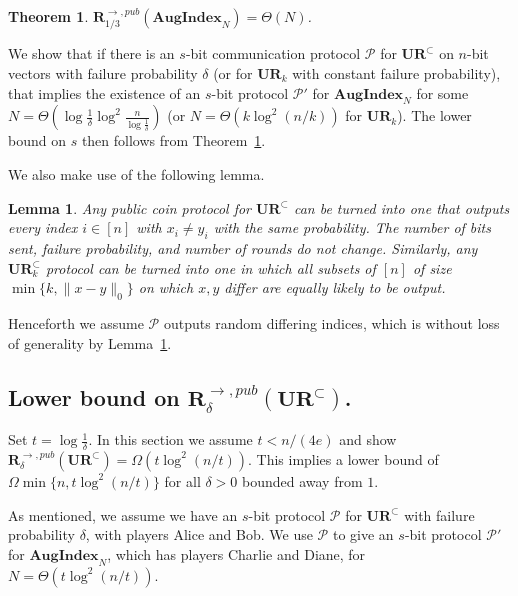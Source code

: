 \documentclass[11pt]{article}
\newtheorem{theorem}{Theorem}
\newtheorem{lemma}{Lemma}
\newcommand{\aug}{\mathbf{AugIndex}\xspace}
\newcommand{\ur}{\mathbf{UR}\xspace}
\newcommand{\randcom}{\mathbf{R}}
\begin{document}
\begin{theorem}{\cite{MiltersenNSW98}}\label{thm:mnsw}
$\randcom^{\rightarrow,pub}_{1/3}(\aug_N) = \Theta(N)$.
\end{theorem}

We show that if there is an $s$-bit communication protocol $\mathcal P$ for $\ur^\subset$ on $n$-bit vectors with failure probability $\delta$ (or for $\ur_k$ with constant failure probability), that implies the existence of an $s$-bit protocol $\mathcal P'$ for $\aug_N$ for some $N=\Theta(\log\frac 1{\delta}\log^2\frac n{\log\frac 1{\delta}})$ (or $N=\Theta(k\log^2(n/k))$ for $\ur_k$). The lower bound on $s$ then follows from Theorem~\ref{thm:mnsw}.

We also make use of the following lemma.

\begin{lemma}{\cite{JowhariST11}}\label{lem:rand-ur}
Any public coin protocol for $\ur^\subset$ can be turned into one that outputs every index $i\in[n]$ with $x_i\neq y_i$ with the same probability. The number of bits sent, failure probability, and number of rounds do not change. Similarly, any $\ur_k^\subset$ protocol can be turned into one in which all subsets of $[n]$ of size $\min\{k, \|x-y\|_0\}$ on which $x, y$ differ are equally likely to be output.
\end{lemma}

Henceforth we assume $\mathcal P$ outputs random differing indices, which is without loss of generality by Lemma~\ref{lem:rand-ur}.

\subsection{Lower bound on $\randcom^{\rightarrow,pub}_\delta(\ur^\subset)$.}\label{sec:aug-delta}

Set $t = \log \frac 1{\delta}$. In this section we assume $t < n/(4e)$ and show $\randcom^{\rightarrow,pub}_\delta(\ur^\subset) = \Omega(t\log^2(n/t))$. This implies a lower bound of $\Omega\min\{n, t\log^2(n/t)\}$ for all $\delta>0$ bounded away from $1$.

As mentioned, we assume we have an $s$-bit protocol $\mathcal P$ for $\ur^\subset$ with failure probability $\delta$, with players Alice and Bob. We use $\mathcal P$ to give an $s$-bit protocol $\mathcal P'$ for $\aug_N$, which has players Charlie and Diane, for $N = \Theta(t\log^2(n/t))$.
\end{document}

